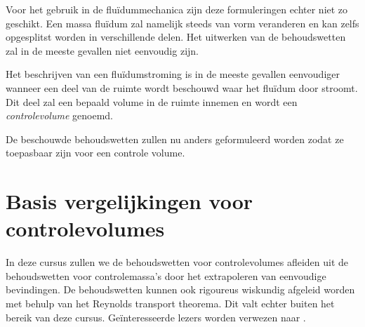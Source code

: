 Voor het gebruik in de fluïdummechanica zijn deze formuleringen echter niet zo geschikt. Een massa fluïdum zal namelijk steeds van vorm veranderen en kan zelfs opgesplitst worden in verschillende delen. Het uitwerken van de behoudswetten zal in de meeste gevallen niet eenvoudig zijn.

Het beschrijven van een fluïdumstroming is in de meeste gevallen eenvoudiger wanneer een deel van de ruimte wordt beschouwd waar het fluïdum door stroomt. Dit deel zal een bepaald volume in de ruimte innemen en wordt een \emph{controlevolume} genoemd.

De beschouwde behoudswetten zullen nu anders geformuleerd worden zodat ze toepasbaar zijn voor een controle volume.

	\section{Basis vergelijkingen voor controlevolumes}
	\label{sec:Basis vergelijkingen voor controlevolumes}
In deze cursus zullen we de behoudswetten voor controlevolumes afleiden uit de behoudswetten voor controlemassa's door het extrapoleren van eenvoudige bevindingen. De behoudswetten kunnen ook rigoureus wiskundig afgeleid worden met behulp van het Reynolds transport theorema. Dit valt echter buiten het bereik van deze cursus. Geïnteresseerde lezers worden verwezen naar \cite{Schobeiri2010}.

